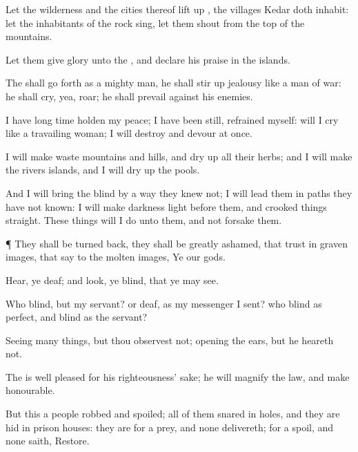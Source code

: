 {Let the
wilderness and the
cities thereof lift
up
{}, the
villages
{}
Kedar doth
inhabit: let the
inhabitants of the
rock
sing, let them
shout from the
top of the
mountains.

Let them
give
glory unto the
{}, and
declare his
praise in the
islands.


\par }{\PP {}The
{} shall go
forth as a mighty
man, he shall stir
up
jealousy like a
man of
war: he shall
cry, yea,
roar; he shall
prevail against his
enemies.

I have long
time holden my
peace; I have been
still,
{}
refrained myself:
{} will I
cry like a travailing
woman; I will
destroy and
devour at
once.

I will make
waste
mountains and
hills, and dry
up all their
herbs; and I will
make the
rivers
islands, and I will dry
up the
pools.

And I will
bring the
blind by a
way
{} they
knew not; I will
lead them in
paths
{} they have not
known: I will
make
darkness
light
before them, and crooked
things
straight. These
things will I
do unto them, and not
forsake them.


\par }{\PP {}¶ They shall be
turned
back, they shall be
greatly
ashamed, that
trust in graven
images, that
say to the molten
images, Ye
{} our
gods.


\par }{\PP {}Hear, ye
deaf; and
look, ye
blind, that ye may
see.

Who
{}
blind, but my
servant? or
deaf, as my
messenger
{} I
sent? who
{}
blind as
{}
perfect, and
blind as the
{}
servant?

Seeing many
things, but thou
observest not;
opening the
ears, but he
heareth not.

The
{} is well
pleased for his
righteousness’ sake; he will
magnify the
law, and make
{}
honourable.

But this
{} a
people
robbed and
spoiled;
{} all of them
snared in
holes, and they are
hid in
prison
houses: they are for a
prey, and none
delivereth; for a
spoil, and none
saith,
Restore.

}
